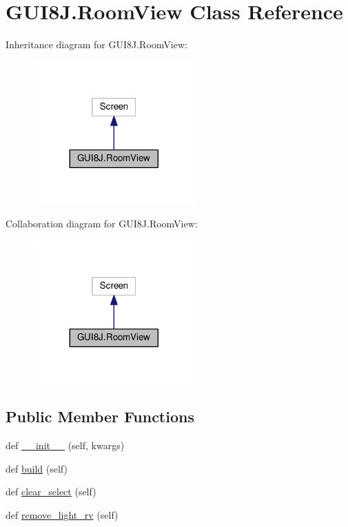 \hypertarget{classGUI8J_1_1RoomView}{}\section{G\+U\+I8\+J.\+Room\+View Class Reference}
\label{classGUI8J_1_1RoomView}


Inheritance diagram for G\+U\+I8\+J.\+Room\+View\+:\nopagebreak
\begin{figure}[H]
\begin{center}
\leavevmode
\includegraphics[width=176pt]{classGUI8J_1_1RoomView__inherit__graph}
\end{center}
\end{figure}


Collaboration diagram for G\+U\+I8\+J.\+Room\+View\+:\nopagebreak
\begin{figure}[H]
\begin{center}
\leavevmode
\includegraphics[width=176pt]{classGUI8J_1_1RoomView__coll__graph}
\end{center}
\end{figure}
\subsection*{Public Member Functions}
\begin{DoxyCompactItemize}
\item 
def \hyperlink{classGUI8J_1_1RoomView_abdd1610222b7965da88ea0fb392a07c2}{\+\_\+\+\_\+init\+\_\+\+\_\+} (self, kwargs)
\item 
def \hyperlink{classGUI8J_1_1RoomView_a3c3f1fc067fd2ebed632e1b67c530962}{build} (self)
\item 
def \hyperlink{classGUI8J_1_1RoomView_a9891bdfcea5d6160d32fdb85aecf4091}{clear\+\_\+select} (self)
\item 
def \hyperlink{classGUI8J_1_1RoomView_a494cf304473168ccc8c02bf21db720e3}{remove\+\_\+light\+\_\+rv} (self)
\end{DoxyCompactItemize}
